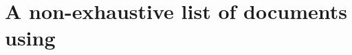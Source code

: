 \chapter[A non-exhastive list of documents using \sisyphe{}]{A non-exhaustive list of documents using \sisyphe{}}









